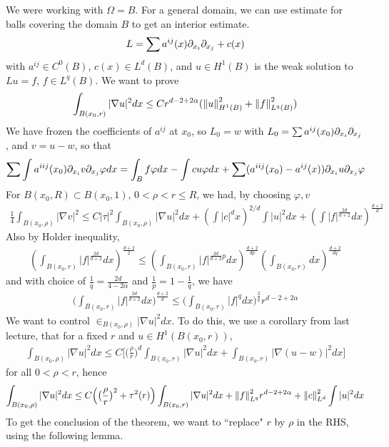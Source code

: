 \documentclass[12pt,a4paper]{article}
\begin{document}
We were working with $\Omega = B$. For a general domain, we can use estimate for balls covering the domain $B$ to get an interior estimate.
\begin{align*}
L =\sum a^{ij}(x) \partial_{x_i} \partial_{x_j} + c(x)
\end{align*}
with $a^{ij} \in C^0(B)$, $c(x) \in L^d(B)$, and $u\in H^1(B)$ is the weak solution to $Lu =f$, $f\in L^q(B)$. We want to prove
\begin{align*}
\int_{B(x_0,r)} |\nabla u|^2 dx \leq Cr^{d-2+2\alpha} (\snorms{u}{H^1(B)}^2 + \snorms{f}{L^q(B)}^2)
\end{align*}
We have frozen the coefficients of $a^{ij}$ at $x_0$, so $L_0 = w$ with $L_0 = \sum a^{ij}(x_0) \partial_{x_i} \partial_{x_j}$, and $v =u-w$, so that
\begin{align*}
\sum \int a^{iij}(x_0) \partial_{x_i} v \partial_{x_j} \varphi dx = \int_B f\varphi dx - \int cu \varphi dx + \sum (a^{iij}(x_0) - a^{ij}(x)) \partial_{x_i} u \partial_{x_j} \varphi 
\end{align*}
\quad For $B(x_0, R) \subset B(x_0, 1)$, $0< \rho < r \leq R$, we had, by choosing $\varphi,v$
\begin{align*}
\frac{1}{4} \int_{B(x_0, \rho)} |\nabla v|^2 \leq C |\tau|^2 \int_{B(x_0, \rho)} |\nabla u|^2 dx + (\int |c|^d x)^{2/d} \int |u|^2 dx + (\int |f|^{\frac{2d}{d+2}}dx)^{\frac{d+2}{d}}
\end{align*}
Also by Holder inequality,
\begin{align*}
(\int_{B(x_0, r)} |f|^{\frac{2d}{d+2}}dx)^{\frac{d+2}{2}} \leq (\int_{B(x_0, r)}|f|^{\frac{2d}{d+2}p}dx)^{\frac{d+2}{dp}} (\int_{B(x_0, r)} dx)^{\frac{d+2}{dq}}
\end{align*}
and with choice of $\frac{1}{q} = \frac{2d}{4- 2\alpha}$ and $\frac{1}{p}= 1-\frac{1}{q}$, we have
\begin{align*}
\Big( \int_{B(x_0, r)} |f|^{\frac{2d}{d+2}} dx\Big)^{\frac{d+2}{d}} \leq \Big( \int_{B(x_0, r)} |f|^{q}dx \Big)^{\frac{2}{q}} r^{d-2 + 2\alpha}
\end{align*}
We want to control $\in_{B(x_0, \rho)} |\nabla u|^2 dx$. To do this, we use a corollary from last lecture, that for a fixed $r$ and $u\in H^1(B(x_0, r))$,
\begin{align*}
\int_{B(x_0, \rho)}|\nabla u|^2 dx \leq C \Big[ \big( \frac{\rho}{r} \big)^d \int_{B(x_0, r)} |\nabla u|^2 dx + \int_{B(x_0, r)} |\nabla(u-w)|^2 dx \Big]
\end{align*}
for all $0< \rho <r$, hence
\begin{align*}
\int_{B(x_0, \rho)} |\nabla u|^2 dx \leq C\Big( \big(\frac{\rho}{r} \big)^2 + \tau^2(r)\Big) \int_{B(x_0, r)} |\nabla u|^2 dx + \snorms{f}{L^q}^2 r^{d-2+2\alpha} + \snorms{c}{L^d}^2 \int |u|^2 dx
\end{align*}
To get the conclusion of the theorem, we want to ``replace" $r$ by $\rho$ in the RHS, using the following lemma.
\s
\end{document}
